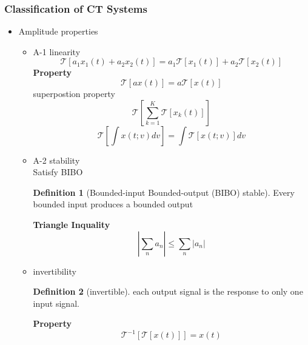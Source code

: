 \documentclass{article}
\theoremstyle{definition}
\newtheorem{definition}{Definition}[subsection]
\begin{document}
\subsubsection{Classification of CT Systems}
\begin{itemize}
    \item Amplitude properties
        \begin{itemize}
            \item A-1 linearity
                \begin{equation}
                    \mathcal{T}[a_1x_1(t)+a_2x_2(t)] = a_1\mathcal{T}[x_1(t)]+a_2 \mathcal{T}[x_2(t)]
                \end{equation}
                \textbf{Property}\\
                \begin{equation}
                    \mathcal{T}[ax(t)] = a\mathcal{T}[x(t)]
                \end{equation}
                superpostion property
                \begin{equation}
                    \mathcal{T}[\sum_{k=1}^{K} \mathcal{T}[x_k(t)]]
                \end{equation}
                \begin{equation}
                    \mathcal{T}[\int x(t;v)dv]=\int \mathcal{T}[x(t;v)]dv
                \end{equation}
            \item A-2 stability\\
                Satisfy BIBO
               \begin{definition}[Bounded-input Bounded-output (BIBO) stable]
                   Every bounded input produces a bounded output
               \end{definition}
               \textbf{Triangle Inquality}\\
               \begin{equation}
                   |\sum_n a_n| \leq \sum_n |a_n|
               \end{equation}
            \item invertibility
                \begin{definition}[invertible]
                    each output signal is the response to only one input signal.
                \end{definition}
                \textbf{Property}\\
                \begin{equation}
                    \mathcal{T}^{-1}[\mathcal{T}[x(t)]]=x(t)

\end{equation}
\end{itemize}
\end{itemize}
\end{document}
